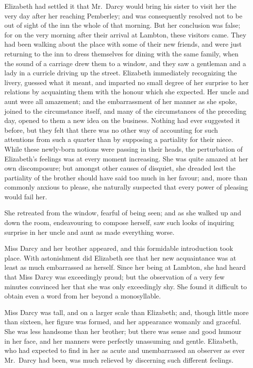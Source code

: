 \documentclass[12pt,english,oneside]{book}
\begin{document}
Elizabeth had settled it that Mr.\ Darcy would bring his sister to
visit her the very day after her reaching Pemberley; and was consequently
resolved not to be out of sight of the inn the whole of that morning.
But her conclusion was false; for on the very morning after their
arrival at Lambton, these visitors came. They had been walking about
the place with some of their new friends, and were just returning
to the inn to dress themselves for dining with the same family, when
the sound of a carriage drew them to a window, and they saw a gentleman
and a lady in a curricle driving up the street. Elizabeth immediately
recognizing the livery, guessed what it meant, and imparted no small
degree of her surprise to her relations by acquainting them with the
honour which she expected. Her uncle and aunt were all amazement;
and the embarrassment of her manner as she spoke, joined to the circumstance
itself, and many of the circumstances of the preceding day, opened
to them a new idea on the business. Nothing had ever suggested it
before, but they felt that there was no other way of accounting for
such attentions from such a quarter than by supposing a partiality
for their niece. While these newly-born notions were passing in their
heads, the perturbation of Elizabeth's feelings was at every moment
increasing. She was quite amazed at her own discomposure; but amongst
other causes of disquiet, she dreaded lest the partiality of the brother
should have said too much in her favour; and, more than commonly anxious
to please, she naturally suspected that every power of pleasing would
fail her.

She retreated from the window, fearful of being seen; and as she walked
up and down the room, endeavouring to compose herself, saw such looks
of inquiring surprise in her uncle and aunt as made everything worse.

Miss Darcy and her brother appeared, and this formidable introduction
took place. With astonishment did Elizabeth see that her new acquaintance
was at least as much embarrassed as herself. Since her being at Lambton,
she had heard that Miss Darcy was exceedingly proud; but the observation
of a very few minutes convinced her that she was only exceedingly
shy. She found it difficult to obtain even a word from her beyond
a monosyllable.

Miss Darcy was tall, and on a larger scale than Elizabeth; and, though
little more than sixteen, her figure was formed, and her appearance
womanly and graceful. She was less handsome than her brother; but
there was sense and good humour in her face, and her manners were
perfectly unassuming and gentle. Elizabeth, who had expected to find
in her as acute and unembarrassed an observer as ever Mr.\ Darcy
had been, was much relieved by discerning such different feelings.
\end{document}

